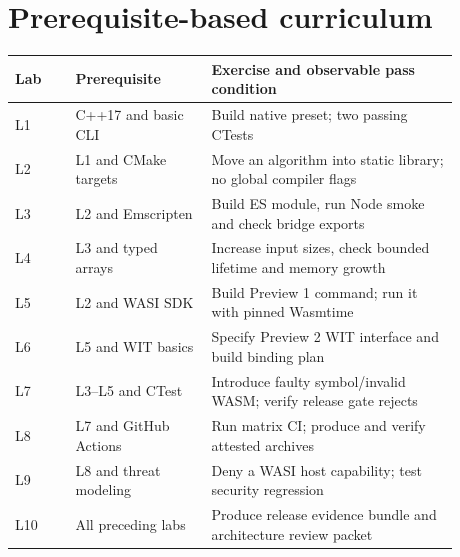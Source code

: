 \documentclass[11pt,letterpaper]{article}
\begin{document}
\frontmatterdoc
\section{Prerequisite-based curriculum}
\begin{longtable}{p{0.12\linewidth}p{0.27\linewidth}p{0.49\linewidth}}
\toprule Lab & Prerequisite & Exercise and observable pass condition \\ \midrule \endhead
L1 & C++17 and basic CLI & Build native preset; two passing CTests \\
L2 & L1 and CMake targets & Move an algorithm into static library; no global compiler flags \\
L3 & L2 and Emscripten & Build ES module, run Node smoke and check bridge exports \\
L4 & L3 and typed arrays & Increase input sizes, check bounded lifetime and memory growth \\
L5 & L2 and WASI SDK & Build Preview 1 command; run it with pinned Wasmtime \\
L6 & L5 and WIT basics & Specify Preview 2 WIT interface and build binding plan \\
L7 & L3--L5 and CTest & Introduce faulty symbol/invalid WASM; verify release gate rejects \\
L8 & L7 and GitHub Actions & Run matrix CI; produce and verify attested archives \\
L9 & L8 and threat modeling & Deny a WASI host capability; test security regression \\
L10 & All preceding labs & Produce release evidence bundle and architecture review packet \\
\bottomrule
\end{longtable}
\end{document}
